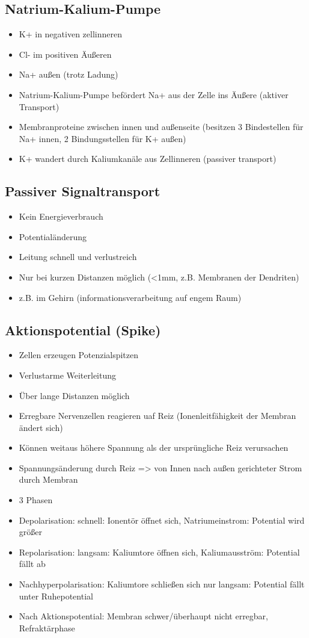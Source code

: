 \documentclass[a4paper,10pt,oneside]{article}
\begin{document}
\subsection{Natrium-Kalium-Pumpe}
\begin{itemize}
	\item K+ in negativen zellinneren
	\item Cl- im positiven Äußeren
	\item Na+ außen (trotz Ladung)
	\item Natrium-Kalium-Pumpe befördert Na+ aus der Zelle ins Äußere (aktiver Transport)
	\item Membranproteine zwischen innen und außenseite (besitzen 3 Bindestellen für Na+ innen, 2 Bindungsstellen für K+ außen)
	\item K+ wandert durch Kaliumkanäle aus Zellinneren (passiver transport)
\end{itemize}

\subsection{Passiver Signaltransport}
\begin{itemize}
	\item Kein Energieverbrauch
	\item Potentialänderung
	\item Leitung schnell und verlustreich
	\item Nur bei kurzen Distanzen möglich (<1mm, z.B. Membranen der Dendriten)
	\item z.B. im Gehirn (informationsverarbeitung auf engem Raum)
\end{itemize}

\subsection{Aktionspotential (Spike)}
\begin{itemize}
	\item Zellen erzeugen Potenzialspitzen
	\item Verlustarme Weiterleitung
	\item Über lange Distanzen möglich
	
	\item Erregbare Nervenzellen reagieren uaf Reiz (Ionenleitfähigkeit der Membran ändert sich)
	\item Können weitaus höhere Spannung als der ursprüngliche Reiz verursachen
	\item Spannungsänderung durch Reiz => von Innen nach außen gerichteter Strom durch Membran
	\item 3 Phasen
	\item Depolarisation: schnell: Ionentör öffnet sich, Natriumeinstrom: Potential wird größer
	\item Repolarisation: langsam: Kaliumtore öffnen sich, Kaliumausström: Potential fällt ab
	\item Nachhyperpolarisation: Kaliumtore schließen sich nur langsam: Potential fällt unter Ruhepotential
	\item Nach Aktionspotential: Membran schwer/überhaupt nicht erregbar, Refraktärphase
	
\end{itemize}
\end{document}
